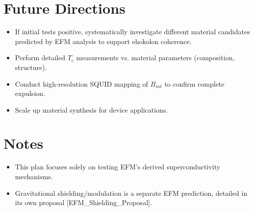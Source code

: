 \documentclass[a4paper,12pt]{article}
\newcommand{\citepaper}[1]{[#1]} %
\begin{document}
\section{Future Directions}
\begin{itemize}
    \item If initial tests positive, systematically investigate different material candidates predicted by EFM analysis to support ehokolon coherence.
    \item Perform detailed \(T_c\) measurements vs. material parameters (composition, structure).
    \item Conduct high-resolution SQUID mapping of \(B_{int}\) to confirm complete expulsion.
    \item Scale up material synthesis for device applications.
\end{itemize}

\section{Notes}
\begin{itemize}
    \item This plan focuses solely on testing EFM's derived superconductivity mechanisms.
    \item Gravitational shielding/modulation is a separate EFM prediction, detailed in its own proposal \citepaper{EFM_Shielding_Proposal}.
\end{itemize}


\appendix
\end{document}
